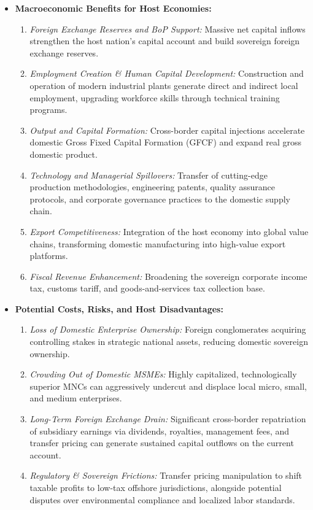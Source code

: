 \begin{itemize}[leftmargin=1.5em]
    \item \textbf{Macroeconomic Benefits for Host Economies:}
    \begin{enumerate}[label=(\alph*), noitemsep]
        \item \textit{Foreign Exchange Reserves and BoP Support:} Massive net capital inflows strengthen the host nation's capital account and build sovereign foreign exchange reserves.
        \item \textit{Employment Creation \& Human Capital Development:} Construction and operation of modern industrial plants generate direct and indirect local employment, upgrading workforce skills through technical training programs.
        \item \textit{Output and Capital Formation:} Cross-border capital injections accelerate domestic Gross Fixed Capital Formation (GFCF) and expand real gross domestic product.
        \item \textit{Technology and Managerial Spillovers:} Transfer of cutting-edge production methodologies, engineering patents, quality assurance protocols, and corporate governance practices to the domestic supply chain.
        \item \textit{Export Competitiveness:} Integration of the host economy into global value chains, transforming domestic manufacturing into high-value export platforms.
        \item \textit{Fiscal Revenue Enhancement:} Broadening the sovereign corporate income tax, customs tariff, and goods-and-services tax collection base.
    \end{enumerate}
    \item \textbf{Potential Costs, Risks, and Host Disadvantages:}
    \begin{enumerate}[label=(\alph*), noitemsep]
        \item \textit{Loss of Domestic Enterprise Ownership:} Foreign conglomerates acquiring controlling stakes in strategic national assets, reducing domestic sovereign ownership.
        \item \textit{Crowding Out of Domestic MSMEs:} Highly capitalized, technologically superior MNCs can aggressively undercut and displace local micro, small, and medium enterprises.
        \item \textit{Long-Term Foreign Exchange Drain:} Significant cross-border repatriation of subsidiary earnings via dividends, royalties, management fees, and transfer pricing can generate sustained capital outflows on the current account.
        \item \textit{Regulatory \& Sovereign Frictions:} Transfer pricing manipulation to shift taxable profits to low-tax offshore jurisdictions, alongside potential disputes over environmental compliance and localized labor standards.
    \end{enumerate}
\end{itemize}

